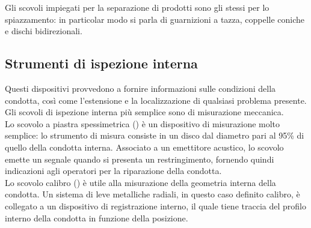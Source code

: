 Gli scovoli impiegati per la separazione di prodotti sono gli stessi per lo spiazzamento: in particolar modo si parla di guarnizioni a tazza, coppelle coniche e dischi bidirezionali.

\subsection{Strumenti di ispezione interna}
Questi dispositivi provvedono a fornire informazioni sulle condizioni della condotta, così come l'estensione e la localizzazione di qualsiasi problema presente. Gli scovoli di ispezione interna più semplice sono di misurazione meccanica.\\
Lo scovolo a piastra spessimetrica () è un dispositivo di misurazione molto semplice: lo strumento di misura consiste in un disco dal diametro pari al 95\% di quello della condotta interna. Associato a un emettitore acustico, lo scovolo emette un segnale quando si presenta un restringimento, fornendo quindi indicazioni agli operatori per la riparazione della condotta. \\
Lo scovolo calibro () è utile alla misurazione della geometria interna della condotta. Un sistema di leve metalliche radiali, in questo caso definito calibro, è collegato a un dispositivo di registrazione interno, il quale tiene traccia del profilo interno della condotta in funzione della posizione. 

